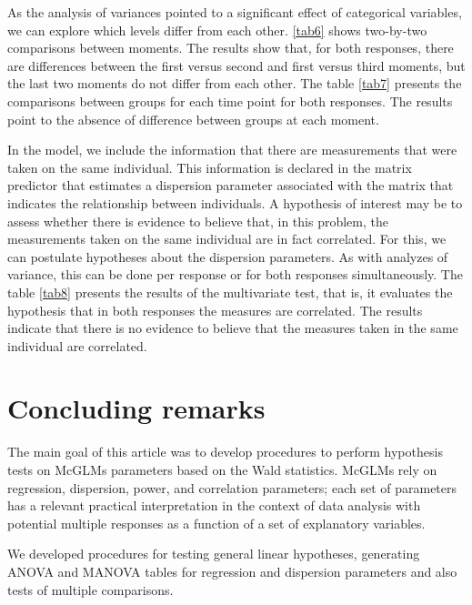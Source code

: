 \documentclass[AMA,STIX1COL]{WileyNJD-v2}
\begin{document}
As the analysis of variances pointed to a significant effect of categorical variables, we can explore which levels differ from each other. \autoref{tab6} shows two-by-two comparisons between moments. The results show that, for both responses, there are differences between the first versus second and first versus third moments, but the last two moments do not differ from each other. The table \autoref{tab7} presents the comparisons between groups for each time point for both responses. The results point to the absence of difference between groups at each moment.

In the model, we include the information that there are measurements that were taken on the same individual. This information is declared in the matrix predictor that estimates a dispersion parameter associated with the matrix that indicates the relationship between individuals. A hypothesis of interest may be to assess whether there is evidence to believe that, in this problem, the measurements taken on the same individual are in fact correlated. For this, we can postulate hypotheses about the dispersion parameters. As with analyzes of variance, this can be done per response or for both responses simultaneously. The table \autoref{tab8} presents the results of the multivariate test, that is, it evaluates the hypothesis that in both responses the measures are correlated. The results indicate that there is no evidence to believe that the measures taken in the same individual are correlated.


\section{Concluding remarks}\label{sec7}

The main goal of this article was to develop procedures to perform hypothesis tests on McGLMs parameters based on the Wald statistics. McGLMs rely on regression, dispersion, power, and correlation parameters; each set of parameters has a relevant practical interpretation in the context of data analysis with potential multiple responses as a function of a set of explanatory variables.

We developed procedures for testing general linear hypotheses, generating ANOVA and MANOVA tables for regression and dispersion parameters and also tests of multiple comparisons.
\end{document}
